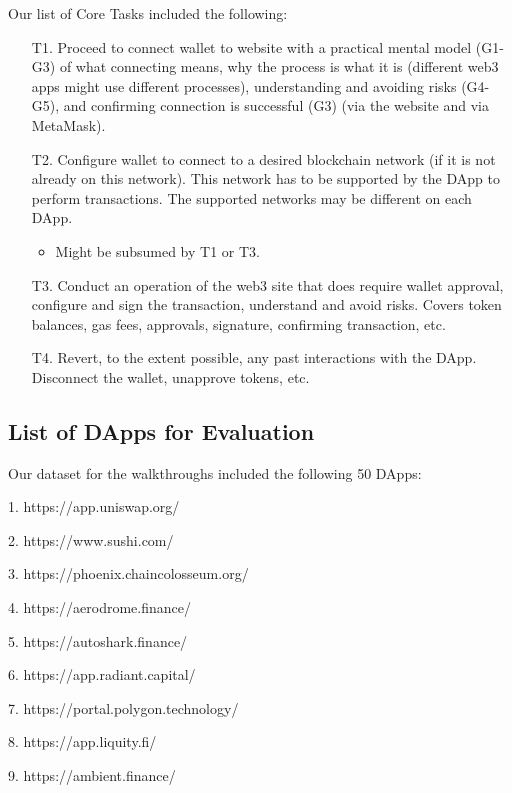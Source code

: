 \documentclass[conference]{IEEEtran}
\begin{document}
\vspace{1em}
\noindent
Our list of Core Tasks included the following:
\begin{enumerate}
	\item[T1.] Proceed to connect wallet to website with a practical mental model (G1-G3) of what connecting means, why the process is what it is (different web3 apps might use different processes), understanding and avoiding risks (G4-G5), and confirming connection is successful (G3) (via the website and via MetaMask).

	\item[T2.] Configure wallet to connect to a desired blockchain network (if it is not already on this network). This network has to be supported by the DApp to perform transactions. The supported networks may be different on each DApp. 
	\begin{itemize}
		\item Might be subsumed by T1 or T3.
	\end{itemize}

	\item[T3.] Conduct an operation of the web3 site that does require wallet approval, configure and sign the transaction, understand and avoid risks. Covers token balances, gas fees, approvals, signature, confirming transaction, etc.

	\item[T4.] Revert, to the extent possible, any past interactions with the DApp. Disconnect the wallet, unapprove tokens, etc. 
\end{enumerate}

\subsection{List of DApps for Evaluation}
Our dataset for the walkthroughs included the following 50 DApps:

1. https://app.uniswap.org/

2. https://www.sushi.com/

3. https://phoenix.chaincolosseum.org/

4. https://aerodrome.finance/

5. https://autoshark.finance/

6. https://app.radiant.capital/

7. https://portal.polygon.technology/

8. https://app.liquity.fi/

9. https://ambient.finance/
\end{document}

